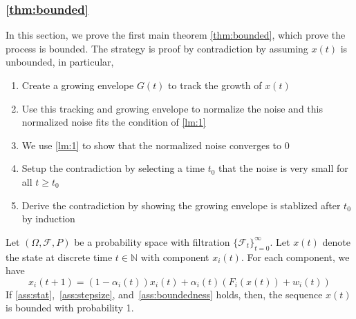 \subsubsection{\autoref{thm:bounded}}
In this section, we prove the first main theorem \autoref{thm:bounded}, which prove the process is bounded.  The strategy is proof by contradiction by assuming $x(t)$ is unbounded, in particular,
\begin{enumerate}
    \item Create a growing envelope $G(t)$ to track the growth of $x(t)$
    \item Use this tracking and growing envelope to normalize the noise and this normalized noise fits the condition of \autoref{lm:1}
    \item We use \autoref{lm:1} to show that the normalized noise converges to 0
    \item Setup the contradiction by selecting a time $t_0$ that the noise is very small for all $t\ge t_0$
    \item Derive the contradiction by showing the growing envelope is stablized after $t_0$ by induction
\end{enumerate}
\begin{theorem}\label{thm:bounded}
Let $(\Omega, \mathcal{F},P)$ be a probability space with filtration $\{\mathcal{F}_t\}_{t=0}^\infty$. Let $x(t)$ denote the state at discrete time $t\in\mathbb{N}$ with component $x_i(t)$. For each component, we have
$$
x_i(t+1) = (1-\alpha_i(t))x_i(t) + \alpha_i(t)(F_i(x(t)) + w_i(t)) 
$$
If \autoref{ass:stat},~\ref{ass:stepsize}, and~\ref{ass:boundedness} holds, then, the sequence $x(t)$ is bounded with probability 1.

\end{theorem}
